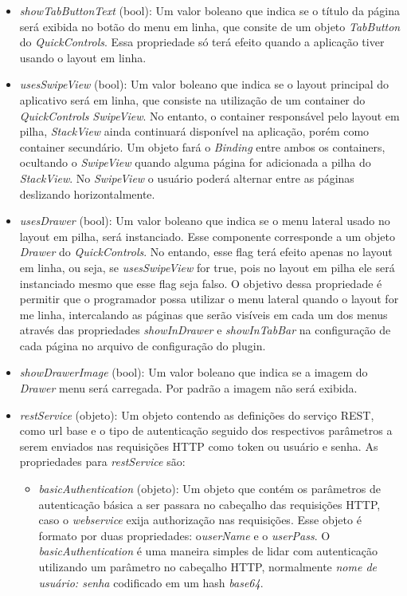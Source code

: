 \begin{itemize}
	\item \textit{showTabButtonText} (bool): Um valor boleano que indica se o título da página será exibida no botão do menu em linha, que consite de um objeto \textit{TabButton} do \textit{QuickControls}. Essa propriedade só terá efeito quando a aplicação tiver usando o layout em linha.

	\item \textit{usesSwipeView} (bool): Um valor boleano que indica se o layout principal do aplicativo será em linha, que consiste na utilização de um container do \textit{QuickControls} \textit{SwipeView}. No entanto, o container responsável pelo layout em pilha, \textit{StackView} ainda continuará disponível na aplicação, porém como container secundário. Um objeto fará o \textit{Binding} entre ambos os containers, ocultando o \textit{SwipeView} quando alguma página for adicionada a pilha do \textit{StackView}. No \textit{SwipeView} o usuário poderá alternar entre as páginas deslizando horizontalmente.

	\item \textit{usesDrawer} (bool): Um valor boleano que indica se o menu lateral usado no layout em pilha, será instanciado. Esse componente corresponde a um objeto \textit{Drawer} do \textit{QuickControls}. No entando, esse flag terá efeito apenas no layout em linha, ou seja, se \textit{usesSwipeView} for true, pois no layout em pilha ele será instanciado mesmo que esse flag seja falso. O objetivo dessa propriedade é permitir que o programador possa utilizar o menu lateral quando o layout for me linha, intercalando as páginas que serão visíveis em cada um dos menus através das propriedades \textit{showInDrawer} e \textit{showInTabBar} na configuração de cada página no arquivo de configuração do plugin.

	\item \textit{showDrawerImage} (bool): Um valor boleano que indica se a imagem do \textit{Drawer} menu será carregada. Por padrão a imagem não será exibida.

	\item \textit{restService} (objeto): Um objeto contendo as definições do serviço REST, como url base e o tipo de autenticação seguido dos respectivos parâmetros a serem enviados nas requisições HTTP como token ou usuário e senha. As propriedades para \textit{restService} são: 

	\begin{itemize}
		\item \textit{basicAuthentication} (objeto): Um objeto que contém os parâmetros de autenticação básica a ser passara no cabeçalho das requisições HTTP, caso o \textit{webservice} exija authorização nas requisições. Esse objeto é formato por duas propriedades: o\textit{userName} e o \textit{userPass}. O \textit{basicAuthentication} é uma maneira simples de lidar com autenticação utilizando um parâmetro no cabeçalho HTTP, normalmente \textit{nome de usuário: senha} codificado em um hash \textit{base64}.


\end{itemize}
\end{itemize}
